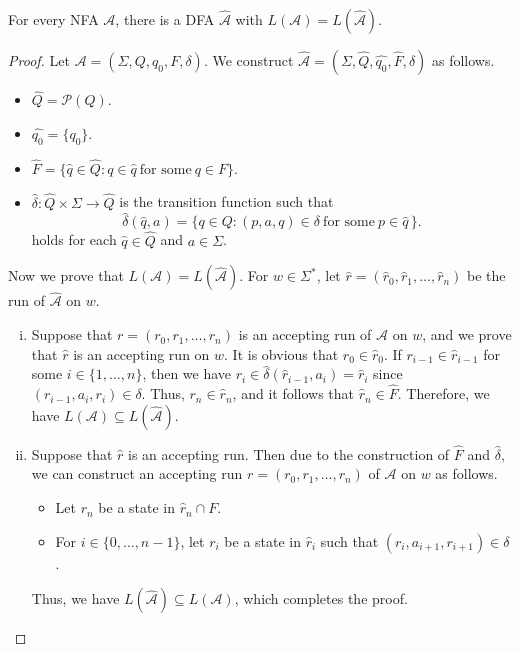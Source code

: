 \begin{theorem}\label{thm:dfa-nfa-equivalence}
  For every NFA $\mathcal{A}$, there is a DFA $\widehat{\mathcal{A}}$ with
  $L(\mathcal{A}) = L(\widehat{\mathcal{A}})$.
\end{theorem}
\begin{proof}
  Let $\mathcal{A} = (\Sigma, Q, q_0, F, \delta)$.
  We construct $\widehat{\mathcal{A}} = (\Sigma, \widehat{Q}, \widehat{q_0},
  \widehat{F}, \widehat{\delta})$ as follows.
  \begin{itemize}
    \item $\widehat{Q} = \mathcal{P}(Q)$.
    \item $\widehat{q_0} = \{q_0\}$.
    \item $\widehat{F} = \{\widehat{q} \in \widehat{Q}:
      q \in \widehat{q}\ \text{for some}\ q \in F\}$.
    \item $\widehat{\delta}: \widehat{Q} \times \Sigma \to \widehat{Q}$ is the
      transition function such that
      \begin{equation*}
        \widehat{\delta}(\widehat{q}, a) = \{q \in Q:
          (p, a, q) \in \delta\ \text{for some}\ p \in \widehat{q}\,\}.
      \end{equation*}
      holds for each $\widehat{q} \in \widehat{Q}$ and $a \in \Sigma$.
  \end{itemize}
  Now we prove that $L(\mathcal{A}) = L(\widehat{\mathcal{A}})$.
  For $w \in \Sigma^*$, let
  $\widehat{r} = (\widehat{r}_0, \widehat{r}_1, \dots, \widehat{r}_n)$ be
  the run of $\widehat{\mathcal{A}}$ on $w$.
  \begin{enumerate}[(i)]
    \item Suppose that $r = (r_0, r_1, \dots, r_n)$ is an accepting run of
      $\mathcal{A}$ on $w$, and we prove that $\widehat{r}$ is an accepting run
      on $w$.
      It is obvious that $r_0 \in \widehat{r}_0$.
      If $r_{i-1} \in \widehat{r}_{i-1}$ for some $i \in \{1, \dots, n\}$, then 
      we have $r_i \in \widehat\delta(\widehat{r}_{i-1}, a_i) = \widehat{r}_i$
      since $(r_{i-1}, a_i, r_i) \in \delta$.
      Thus, $r_n \in \widehat{r}_n$, and it follows that
      $\widehat{r}_n \in \widehat{F}$.
      Therefore, we have $L(\mathcal{A}) \subseteq L(\widehat{\mathcal{A}})$.
    \item Suppose that $\widehat{r}$ is an accepting run.
      Then due to the construction of $\widehat{F}$ and $\widehat\delta$, we
      can construct an accepting run $r = (r_0, r_1, \dots, r_n)$ of
      $\mathcal{A}$ on $w$ as follows.
      \begin{itemize}
        \item Let $r_n$ be a state in $\widehat{r}_n \cap F$.
        \item For $i \in \{0, \dots, n-1\}$, let $r_i$ be a state in
          $\widehat{r}_i$ such that $(r_i, a_{i+1}, r_{i+1}) \in \delta$.
      \end{itemize}
      Thus, we have $L(\widehat{\mathcal{A}}) \subseteq L(\mathcal{A})$,
      which completes the proof. \qedhere
  \end{enumerate}
\end{proof}

